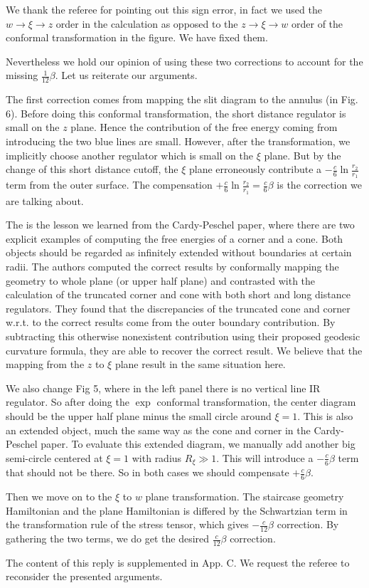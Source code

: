 \documentclass{article}
\newcommand{\reply}[1]{{\color{black}#1}}
\begin{document}
\reply{
We thank the referee for pointing out this sign error, in fact we used the $w \rightarrow \xi \rightarrow z$ order in the calculation as opposed to the $z \rightarrow \xi \rightarrow w$ order of the conformal transformation in the figure. We have fixed them.  

Nevertheless we hold our opinion of using these two corrections to account for the missing $\frac{1}{12}\beta$. Let us reiterate our arguments. 

The first correction comes from mapping the slit diagram to the annulus (in Fig. 6).  Before doing this conformal transformation, the short distance regulator is small on the $z$ plane. Hence the contribution of the free energy coming from introducing the two blue lines are small. However, after the transformation, we implicitly choose another regulator which is small on the $\xi$ plane. But by the change of this short distance cutoff, the $\xi$ plane erroneously contribute a $- \frac{c}{6} \ln \frac{r_2}{r_1}$ term from the outer surface. The compensation $+\frac{c}{6} \ln \frac{r_2}{r_1} = \frac{c}{6}\beta$ is the correction we are talking about. 

The is the lesson we learned from the Cardy-Peschel paper, where there are two explicit examples of computing the free energies of a corner and a cone. Both objects should be regarded as infinitely extended without boundaries at certain radii. The authors computed the correct results by conformally mapping the geometry to whole plane (or upper half plane) and contrasted with the calculation of the truncated corner and cone with both short and long distance regulators. They found that the discrepancies of the truncated cone and corner w.r.t. to the correct results come from the outer boundary contribution. By subtracting this otherwise nonexistent contribution using their proposed geodesic curvature formula, they are able to recover the correct result. We believe that the mapping from the $z$ to $\xi$ plane result in the same situation here. 

We also change Fig 5, where in the left panel there is no vertical line IR regulator. So after doing the $\exp$ conformal transformation, the center diagram should be the upper half plane minus the small circle around $\xi = 1$. This is also an extended object, much the same way as the cone and corner in the Cardy-Peschel paper. To evaluate this extended diagram, we manually add another big semi-circle centered at $\xi = 1$ with radius $R_{\xi } \gg 1$. This will introduce a $-\frac{c}{6} \beta $ term that should not be there. So in both cases we should compensate $+\frac{c}{6}\beta$. 

Then we move on to the $\xi$ to $w$ plane transformation. The staircase geometry Hamiltonian and the plane Hamiltonian is differed by the Schwartzian term in the transformation rule of the stress tensor, which gives $-\frac{c}{12} \beta $ correction. By gathering the two terms, we do get the desired $\frac{c}{12}\beta$ correction. 

The content of this reply is supplemented in App. C. We request the referee to reconsider the presented arguments.
}
\end{document}
